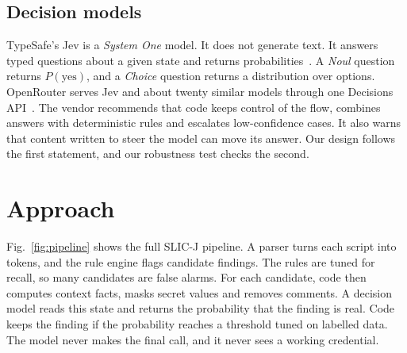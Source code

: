 \documentclass[conference]{IEEEtran}
\newcommand{\slicj}{SLIC-J}
\begin{document}
\subsection{Decision models}
TypeSafe's Jev is a \emph{System One} model. It does not generate text. It answers typed questions about a given
state and returns probabilities~\cite{typesafe2026jev}. A \emph{Noul} question returns $P(\text{yes})$, and a
\emph{Choice} question returns a distribution over options. OpenRouter serves Jev and about twenty similar models
through one Decisions API~\cite{openrouter2026jev}. The vendor recommends that code keeps control of the flow, combines
answers with deterministic rules and escalates low-confidence cases. It also warns that content written to steer the
model can move its answer. Our design follows the first statement, and our robustness test checks the second.

\section{Approach}
Fig.~\ref{fig:pipeline} shows the full \slicj{} pipeline. A parser turns each script into tokens, and the rule engine
flags candidate findings. The rules are tuned for recall, so many candidates are false alarms. For each candidate,
code then computes context facts, masks secret values and removes comments. A decision model reads this state and
returns the probability that the finding is real. Code keeps the finding if the probability reaches a threshold tuned
on labelled data. The model never makes the final call, and it never sees a working credential.
\end{document}
